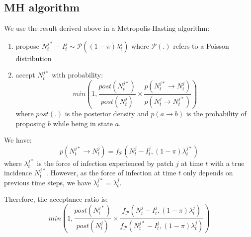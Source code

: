 \documentclass[a4paper,11pt]{article}
\begin{document}
\subsection{MH algorithm}

We use the result derived above in a Metropolis-Hasting algorithm:
\begin{enumerate}
 \item propose $N_t^{j*} - I_t^j \sim  \mathcal{P}((1-\pi)\lambda_t^j)$ where 
$\mathcal{P}(.)$ refers to a Poisson distribution
 \item accept $N_t^{j*}$ with probability:
 $$
 min(1, \frac{post(N_t^{j*})}{post(N_t^j)} \times \frac{p(N_t^{j*} \rightarrow 
N_t^j)}{p(N_t^{j} \rightarrow N_t^{j*})})
 $$
where $post(.)$ is the posterior density and $p(a \rightarrow b)$ is the 
probability of proposing $b$ while being in state $a$.
\end{enumerate}
We have:
\begin{equation}
 p(N_t^{j*} \rightarrow N_t^j) = f_{\mathcal{P}}(N_t^j-I_t^j, (1-\pi)\lambda_t^{j*})
\end{equation}
where $\lambda_t^{j*}$ is the force of infection experienced by patch $j$ at 
time $t$ with a true incidence $N_t^{j*}$.
However, as the force of infection at time $t$ only depends on previous time 
steps, we have $\lambda_t^{j*} = \lambda_t^{j} $.

Therefore, the acceptance ratio is:
\begin{equation}
min(1, \frac{post(N_t^{j*})}{post(N_t^j)} \times
\frac{f_{\mathcal{P}}(N_t^j-I_t^j, 
(1-\pi)\lambda_t^j)}{f_{\mathcal{P}}(N_t^{j*}-I_t^j, 
(1-\pi)\lambda_t^j)} )
\end{equation}










%
%
\end{document}

